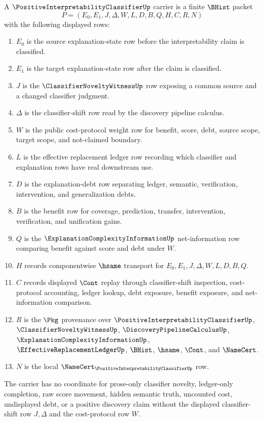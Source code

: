 \begin{definition}
\label{def:positive-interpretability-classifier-carrier}
A $\PositiveInterpretabilityClassifierUp$ carrier is a finite $\BHist$ packet
$$
P=(E_0,E_1,J,\Delta,W,L,D,B,Q,H,C,R,N)
$$
with the following displayed rows:
\begin{enumerate}
\item $E_0$ is the source explanation-state row before the interpretability claim is classified.
\item $E_1$ is the target explanation-state row after the claim is classified.
\item $J$ is the $\ClassifierNoveltyWitnessUp$ row exposing a common source and a changed classifier judgment.
\item $\Delta$ is the classifier-shift row read by the discovery pipeline calculus.
\item $W$ is the public cost-protocol weight row for benefit, score, debt, source scope, target scope, and not-claimed boundary.
\item $L$ is the effective replacement ledger row recording which classifier and explanation rows have real downstream use.
\item $D$ is the explanation-debt row separating ledger, semantic, verification, intervention, and generalization debts.
\item $B$ is the benefit row for coverage, prediction, transfer, intervention, verification, and unification gains.
\item $Q$ is the $\ExplanationComplexityInformationUp$ net-information row comparing benefit against score and debt under $W$.
\item $H$ records componentwise $\hsame$ transport for $E_0,E_1,J,\Delta,W,L,D,B,Q$.
\item $C$ records displayed $\Cont$ replay through classifier-shift inspection, cost-protocol accounting, ledger lookup, debt exposure, benefit exposure, and net-information comparison.
\item $R$ is the $\Pkg$ provenance over $\PositiveInterpretabilityClassifierUp$, $\ClassifierNoveltyWitnessUp$, $\DiscoveryPipelineCalculusUp$, $\ExplanationComplexityInformationUp$, $\EffectiveReplacementLedgerUp$, $\BHist$, $\hsame$, $\Cont$, and $\NameCert$.
\item $N$ is the local $\NameCert_{\PositiveInterpretabilityClassifierUp}$ row.
\end{enumerate}
The carrier has no coordinate for prose-only classifier novelty, ledger-only completion, raw score movement, hidden semantic truth, uncounted cost, undisplayed debt, or a positive discovery claim without the displayed classifier-shift row $J,\Delta$ and the cost-protocol row $W$.
\end{definition}

